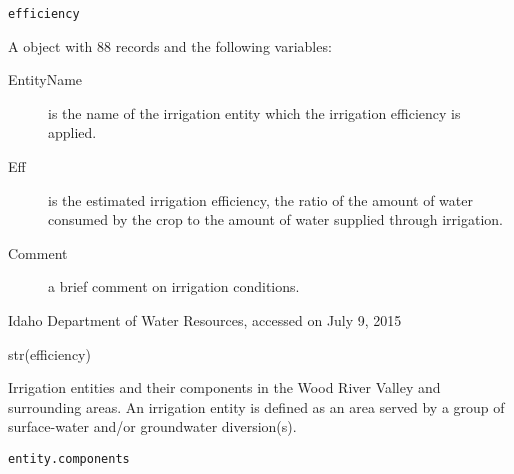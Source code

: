 \documentclass[letterpaper]{book}
\begin{document}
%
\begin{Usage}
\begin{verbatim}
efficiency
\end{verbatim}
\end{Usage}
%
\begin{Format}
A  object with 88 records and the following variables:
\begin{description}

\item[EntityName] is the name of the irrigation entity which the irrigation efficiency is applied.
\item[Eff] is the estimated irrigation efficiency, the ratio of the amount of water consumed by the crop to the amount of water supplied through irrigation.
\item[Comment] a brief comment on irrigation conditions.

\end{description}

\end{Format}
%
\begin{Source}\relax
Idaho Department of Water Resources, accessed on July 9, 2015
\end{Source}
%
\begin{Examples}
\begin{ExampleCode}
str(efficiency)
\end{ExampleCode}
\end{Examples}
%
\begin{Description}\relax
Irrigation entities and their components in the Wood River Valley and surrounding areas.
An irrigation entity is defined as an area served by a group of surface-water and/or groundwater diversion(s).
\end{Description}
%
\begin{Usage}
\begin{verbatim}
entity.components
\end{verbatim}
\end{Usage}
%
\end{document}
